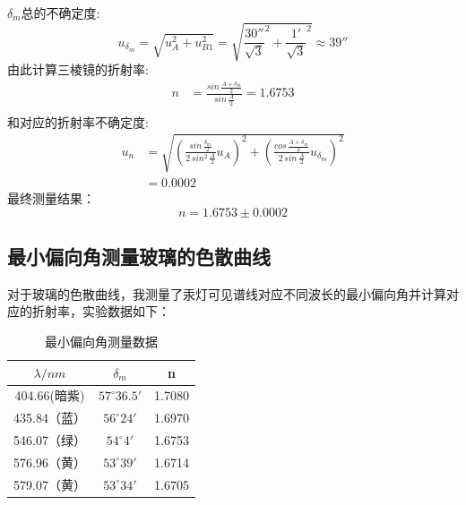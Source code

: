 \documentclass[12pt]{article}
\begin{document}
\quad  $\delta_m$总的不确定度:
\begin{equation*}
    u_{\delta_m} = \sqrt{u_A^2 + u_{B1}^2} = \sqrt{\frac{30''}{\sqrt{3}}^2 + \frac{1'}{\sqrt{3}}^2} \approx 39''
\end{equation*}
\quad 由此计算三棱镜的折射率:
\begin{equation*}
\begin{aligned}
 n&=\frac{sin\, \frac{A+\delta_m}{2}}{sin\, \frac{A}{2}}=1.6753 \\
\end{aligned}
\end{equation*}
\quad 和对应的折射率不确定度:
\begin{equation*}
    \begin{aligned}
     u_n&=\sqrt{(\frac{sin\, \frac{\delta_m}{2}}{2\,sin^2\, \frac{A}{2}}u_A)^2+(\frac{cos\, \frac{A+\delta_m}{2}}{2\,sin\, \frac{A}{2}}u_{\delta_m})^2}\\
        &=0.0002
    \end{aligned}
    \end{equation*}
\quad 最终测量结果：
\begin{equation}
    n = 1.6753 \pm 0.0002
\end{equation}
\subsection{最小偏向角测量玻璃的色散曲线}
\vspace{0.2cm}
\quad 对于玻璃的色散曲线，我测量了汞灯可见谱线对应不同波长的最小偏向角并计算对应的折射率，实验数据如下：\\
\begin{table}[h]
    \centering
    \begin{tabular}{ccc}
    $\lambda/nm$ & $\delta_m$ & n \\ \hline
     404.66(暗紫)   &      $57^{\circ}36.5'$      &   1.7080\\
    435.84（蓝）         &    $56^{\circ}24'$        &  1.6970 \\
      546.07（绿）           &     $54^{\circ}4'$       &  1.6753\\
         576.96（黄）         &     $53^{\circ}39'$       &  1.6714 \\
            579.07（黄）          &    $53^{\circ}34'$        &   1.6705
    \end{tabular}
    \caption{最小偏向角测量数据}
\end{table}
\end{document}
